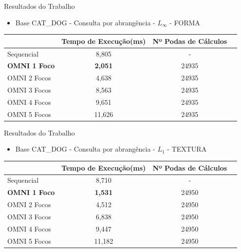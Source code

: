 \documentclass{beamer}
\begin{document}
\begin{frame}{Resultados do Trabalho}
 \begin{itemize}
  \item Base CAT\_DOG - Consulta por abrangência - $L_\infty$ - FORMA
 \end{itemize}
  
  \begin{table}[H]
    \centering
   \begin{tabular}{l c c c}
            &Tempo de Execução(ms)&Nº Podas de Cálculos\\ \hline
            Sequencial & 8,805 & - \\
            \textbf{OMNI 1 Foco} & \textbf{2,051} & 24935 \\
            OMNI 2 Focos & 4,638 & 24935 \\
            OMNI 3 Focos & 8,563 & 24935 \\
            OMNI 4 Focos & 9,651 & 24935 \\
            OMNI 5 Focos & 11,626 & 24935 \\ \hline
    \end{tabular}
\end{table}
  
\end{frame}

\begin{frame}{Resultados do Trabalho}
 \begin{itemize}
  \item Base CAT\_DOG - Consulta por abrangência - $L_1$ - TEXTURA
 \end{itemize}
  
  \begin{table}[H]
    \centering
   \begin{tabular}{l c c c}
            &Tempo de Execução(ms)&Nº Podas de Cálculos\\ \hline
            Sequencial & 8,710 & - \\
            \textbf{OMNI 1 Foco} & \textbf{1,531} & 24950 \\
            OMNI 2 Focos & 4,512 & 24950 \\
            OMNI 3 Focos & 6,838 & 24950 \\
            OMNI 4 Focos & 9,447 & 24950 \\
            OMNI 5 Focos & 11,182 & 24950 \\ \hline
    \end{tabular}
\end{table}
  
\end{frame}
\end{document}
